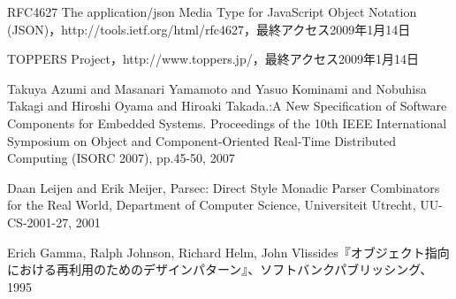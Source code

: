 \documentclass[final,12pt,report]{jsbook}
\begin{document}
\begin{thebibliography}{99}
RFC4627 The application/json Media Type for JavaScript Object Notation (JSON)，http://tools.ietf.org/html/rfc4627，最終アクセス2009年1月14日

TOPPERS Project，http://www.toppers.jp/，最終アクセス2009年1月14日

Takuya Azumi and Masanari Yamamoto and Yasuo Kominami and Nobuhisa Takagi and Hiroshi Oyama and Hiroaki Takada.:A New Specification of Software Components for Embedded Systems. Proceedings of the 10th IEEE International Symposium on Object and Component-Oriented Real-Time Distributed Computing (ISORC 2007), pp.45-50, 2007

Daan Leijen and Erik Meijer,
Parsec: Direct Style Monadic Parser Combinators for the Real World,
Department of Computer Science, Universiteit Utrecht,
UU-CS-2001-27,
2001

Erich Gamma, Ralph Johnson, Richard Helm, John Vlissides『オブジェクト指向における再利用のためのデザインパターン』、ソフトバンクパブリッシング、1995
\end{thebibliography}
\end{document}
